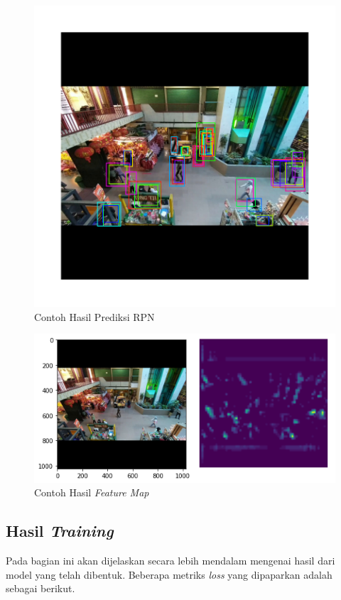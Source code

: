 \begin{figure}[h!]
  \begin{center}
    \includegraphics[width= 0.5\linewidth]{bab4/Prediksi RPN.png}
    \caption{Contoh Hasil Prediksi RPN}
    \label{fig: Prediksi RPN}
  \end{center}
\end{figure}

\begin{figure}[h!]
  \begin{center}
    \includegraphics[width= 0.55\linewidth]{bab4/Feature Map Example.png}
    \caption{Contoh Hasil \textit{Feature Map}}
    \label{fig: Feature Map}
  \end{center}
\end{figure}

\subsection{Hasil \textit{Training}}
Pada bagian ini akan dijelaskan secara lebih mendalam mengenai hasil dari model yang telah dibentuk. 
Beberapa metriks \textit{loss} yang dipaparkan adalah sebagai berikut.

